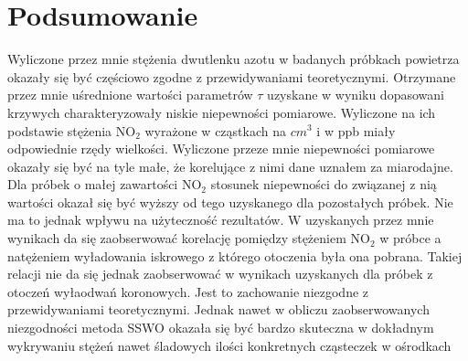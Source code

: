 \documentclass[10pt,a4paper]{article}
\begin{document}
\section*{Podsumowanie}
Wyliczone przez mnie stężenia dwutlenku azotu w badanych próbkach powietrza okazały się być częściowo zgodne z przewidywaniami teoretycznymi. Otrzymane przez mnie uśrednione wartości parametrów $\tau$ uzyskane w wyniku dopasowani krzywych charakteryzowały niskie niepewności pomiarowe. Wyliczone na ich podstawie stężenia $\text{NO}_{\text{2}}$ wyrażone w cząstkach na $cm^3$ i w ppb miały odpowiednie rzędy wielkości. Wyliczone przeze mnie niepewności pomiarowe okazały się być na tyle małe, że korelujące z nimi dane uznałem za miarodajne. Dla próbek o małej zawartości $\text{NO}_{\text{2}}$ stosunek niepewności do związanej z nią wartości okazał się być wyższy od tego uzyskanego dla pozostałych próbek. Nie ma to jednak wpływu na użyteczność rezultatów. W uzyskanych przez mnie wynikach da się zaobserwować korelację pomiędzy stężeniem $\text{NO}_{\text{2}}$ w próbce a natężeniem wyładowania iskrowego z którego otoczenia była ona pobrana. Takiej relacji nie da się jednak zaobserwować w wynikach uzyskanych dla próbek z otoczeń wyłaodwań koronowych. Jest to zachowanie niezgodne z przewidywaniami teoretycznymi. Jednak nawet w obliczu zaobserwowanych niezgodności metoda SSWO okazała się być bardzo skuteczna w dokładnym wykrywaniu stężeń nawet śladowych ilości konkretnych cząsteczek w ośrodkach

\newpage


\end{document}
